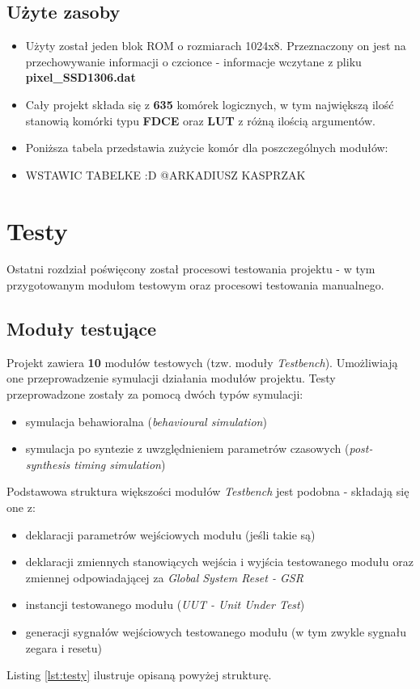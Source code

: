 \documentclass[12pt] {article}
\begin{document}
\subsection{Użyte zasoby}
\begin{itemize}
\item Użyty został jeden blok ROM o rozmiarach 1024x8. Przeznaczony on jest na przechowywanie informacji o czcionce - informacje wczytane z pliku \textbf{pixel\_SSD1306.dat}
\item Cały projekt składa się z \textbf{635} komórek logicznych, w tym największą ilość stanowią komórki typu \textbf{FDCE} oraz \textbf{LUT} z różną ilością argumentów.
\item Poniższa tabela przedstawia zużycie komór dla poszczególnych modułów:
\item WSTAWIC TABELKE :D @ARKADIUSZ KASPRZAK
\end{itemize}

\section{Testy}
Ostatni rozdział poświęcony został procesowi testowania projektu - w tym przygotowanym modułom testowym oraz procesowi testowania manualnego. 

\subsection{Moduły testujące}
Projekt zawiera \textbf{10} modułów testowych (tzw. moduły \textit{Testbench}). Umożliwiają one przeprowadzenie symulacji działania modułów projektu. Testy przeprowadzone zostały za pomocą dwóch typów symulacji:
\begin{itemize}
\item symulacja behawioralna (\textit{behavioural simulation})
\item symulacja po syntezie z uwzględnieniem parametrów czasowych (\textit{post-synthesis timing simulation})
\end{itemize}
Podstawowa struktura większości modułów \textit{Testbench} jest podobna - składają się one z:
\begin{itemize}
\item deklaracji parametrów wejściowych modułu (jeśli takie są)
\item deklaracji zmiennych stanowiących wejścia i wyjścia testowanego modułu oraz zmiennej odpowiadającej za \textit{Global System Reset - GSR}
\item instancji testowanego modułu (\textit{UUT - Unit Under Test})
\item generacji sygnałów wejściowych testowanego modułu (w tym zwykle sygnału zegara i resetu)
\end{itemize}
Listing \ref{lst:testy} ilustruje opisaną powyżej strukturę.
\end{document}
